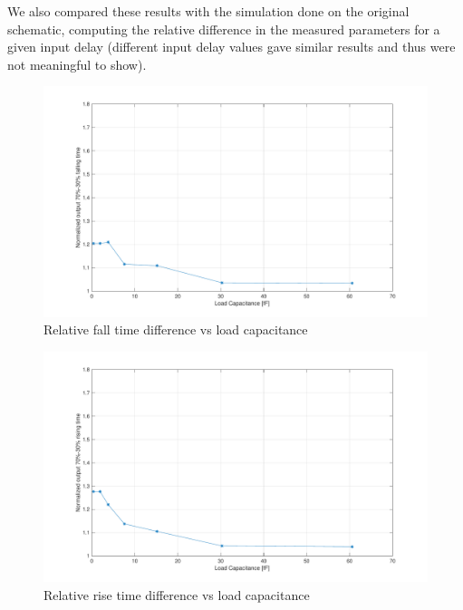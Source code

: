 \documentclass[a4paper]{article}
\begin{document}
We also compared these results with the simulation done on the original schematic, computing the relative difference in the measured parameters for a given input delay (different input delay values gave similar results and thus were not meaningful to show).
\begin{figure}[H]
	\centering
	\includegraphics[width=\linewidth]{../INV_X4/simulations/t_F_diff.pdf}
	\caption{Relative fall time difference vs load capacitance}
	\label{fig:inv_t_F_diff}
\end{figure}
\begin{figure}[H]
	\centering
	\includegraphics[width=\linewidth]{../INV_X4/simulations/t_R_diff.pdf}
	\caption{Relative rise time difference vs load capacitance}
	\label{fig:inv_t_R_diff}
\end{figure}
\end{document}
